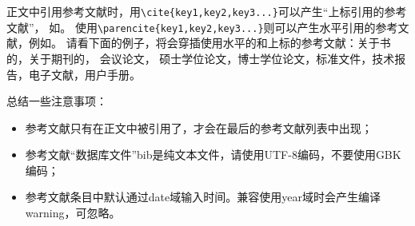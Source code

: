 \documentclass[twoside]{article}
\begin{document}
正文中引用参考文献时，用\verb+\cite{key1,key2,key3...}+可以产生“上标引用的参考文献”，
如\cite{Meta_CN,chen2007act,DPMG}。
使用\verb+\parencite{key1,key2,key3...}+则可以产生水平引用的参考文献，例如\parencite{JohnD,zhubajie,IEEE-1363}。
请看下面的例子，将会穿插使用水平的和上标的参考文献：关于书的\parencite{Meta_CN,JohnD,IEEE-1363}，关于期刊的\cite{chen2007act,chen2007ewi}，
会议论文\parencite{DPMG,kocher99,cnproceed}，
硕士学位论文\parencite{zhubajie,metamori2004}，博士学位论文\cite{shaheshang,FistSystem01,bai2008}，标准文件\parencite{IEEE-1363}，技术报告\cite{NPB2}，电子文献\parencite{xiaoyu2001, CHRISTINE1998}，用户手册\parencite{RManual}。

总结一些注意事项：
\begin{itemize}
\item 参考文献只有在正文中被引用了，才会在最后的参考文献列表中出现；
\item 参考文献“数据库文件”bib是纯文本文件，请使用UTF-8编码，不要使用GBK编码；
\item 参考文献条目中默认通过date域输入时间。兼容使用year域时会产生编译warning，可忽略。
\end{itemize}

    \printbibliography

    
\end{document}

